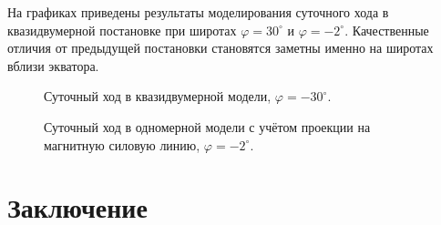 \documentclass[14pt, a4paper, fleqn]{extarticle}
\begin{document}
На графиках приведены результаты моделирования суточного хода в квазидвумерной постановке при широтах $\varphi = 30^\circ$ и $\varphi = -2^\circ$. Качественные отличия от предыдущей постановки становятся заметны именно на широтах вблизи экватора. 


\begin{figure}[H]
\caption{Суточный ход в квазидвумерной модели, $\varphi = -30^\circ$.}
\end{figure}

\begin{figure}[H]
\caption{Суточный ход в одномерной модели с учётом проекции на магнитную силовую линию, $\varphi = -2^\circ$.}
\end{figure}

\newpage

\section{Заключение}
\end{document}
